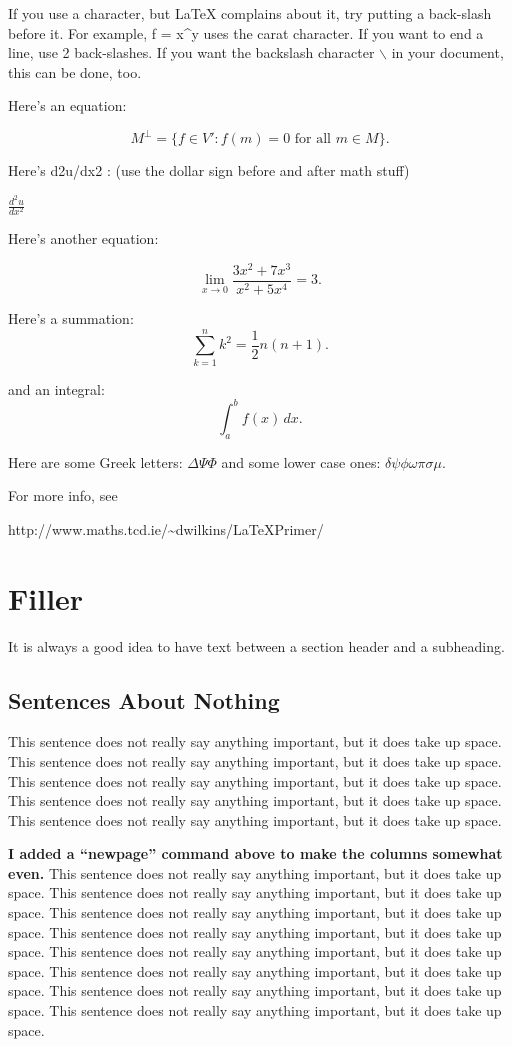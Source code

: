 \documentclass[conference]{IEEEconf}
\begin{document}
If you use a character, but LaTeX complains about it, try putting a 
back-slash before it. For example, 
f = x\^{}y  uses the carat character. 
If you want to end a line, use 2 back-slashes.
If you want the backslash character $\backslash$ in your document,
this can be done, too.

Here's an equation:

\[ M^\bot = \{ f \in V' : f(m) = 0 \mbox{ for all } m \in M \}.\]

Here's d2u/dx2 : (use the dollar sign before and after math stuff)

$ \frac{d^2 u}{dx^2} $

Here's another equation:

\[ \lim_{x \to 0} \frac{3x^2 +7x^3}{x^2 +5x^4} = 3.\]

Here's a summation:
\[ \sum_{k=1}^n k^2 = \frac{1}{2} n (n+1).\] 

and an integral:
\[ \int_a^b f(x)\,dx.\]

Here are some Greek letters:
$ \Delta \Psi \Phi $
and some lower case ones:
$ \delta \psi \phi \omega \pi \sigma \mu $.

For more info, see


http://www.maths.tcd.ie/\~{}dwilkins/LaTeXPrimer/

\section{Filler}

It is always a good idea to have text between a section header and
a subheading.

\subsection{Sentences About Nothing}

This sentence does not really say anything important, but it does take up space.
This sentence does not really say anything important, but it does take up space.
This sentence does not really say anything important, but it does take up space.
This sentence does not really say anything important, but it does take up space.
This sentence does not really say anything important, but it does take up space.

\newpage

{\bf I added a ``newpage'' command above to make the columns somewhat even.}
This sentence does not really say anything important, but it does take up space.
This sentence does not really say anything important, but it does take up space.
This sentence does not really say anything important, but it does take up space.
This sentence does not really say anything important, but it does take up space.
This sentence does not really say anything important, but it does take up space.
This sentence does not really say anything important, but it does take up space.
This sentence does not really say anything important, but it does take up space.
This sentence does not really say anything important, but it does take up space.
\end{document}

